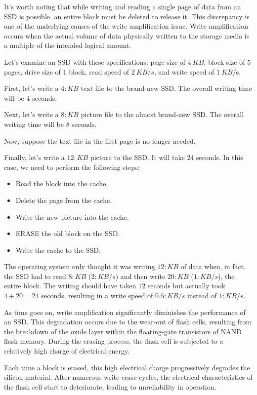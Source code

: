 It's worth noting that while writing and reading a single page of data from an SSD is possible, an entire block must be deleted to release it.
This discrepancy is one of the underlying causes of the write amplification issue. 
Write amplification occurs when the actual volume of data physically written to the storage media is a multiple of the intended logical amount.
\begin{example}
    Let's examine an SSD with these specifications: page size of $4\:KB$, block size of $5$ pages, drive size of $1$ block, read speed of $2\:KB/s$, and write speed of $1\:KB/$s.
    
    First, let's write a $4:KB$ text file to the brand-new SSD. 
    The overall writing time will be $4$ seconds.

    Next, let's write a $8:KB$ picture file to the almost brand-new SSD.
    The overall writing time will be $8$ seconds.

    Now, suppose the text file in the first page is no longer needed.

    Finally, let's write a $12:KB$ picture to the SSD. 
    It will take $24$ seconds. 
    In this case, we need to perform the following steps:
    \begin{itemize}
        \item Read the block into the cache.
        \item Delete the page from the cache.
        \item Write the new picture into the cache.
        \item ERASE the old block on the SSD.
        \item Write the cache to the SSD.
    \end{itemize}
    The operating system only thought it was writing $12:KB$ of data when, in fact, the SSD had to read $8:KB$ ($2:KB/s$) and then write $20:KB$ ($1:KB/s$), the entire block.
    The writing should have taken $12$ seconds but actually took $4 + 20 = 24$ seconds, resulting in a write speed of $0.5:KB/s$ instead of $1:KB/s$.
\end{example}
As time goes on, write amplification significantly diminishes the performance of an SSD. 
This degradation occurs due to the wear-out of flash cells, resulting from the breakdown of the oxide layer within the floating-gate transistors of NAND flash memory. 
During the erasing process, the flash cell is subjected to a relatively high charge of electrical energy.

Each time a block is erased, this high electrical charge progressively degrades the silicon material. 
After numerous write-erase cycles, the electrical characteristics of the flash cell start to deteriorate, leading to unreliability in operation.


